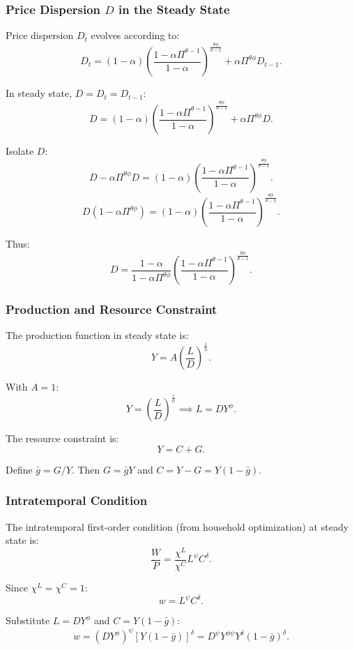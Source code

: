 \documentclass[12pt]{article}
\begin{document}
\subsubsection{Price Dispersion $D$ in the Steady State}

Price dispersion $D_t$ evolves according to:
\[
D_t = (1-\alpha)\left(\frac{1-\alpha \Pi^{\theta-1}}{1-\alpha}\right)^{\frac{\theta\phi}{\theta-1}} + \alpha \Pi^{\theta\phi}D_{t-1}.
\]

In steady state, $D=D_t=D_{t-1}$:
\[
D = (1-\alpha)\left(\frac{1-\alpha \Pi^{\theta-1}}{1-\alpha}\right)^{\frac{\theta\phi}{\theta-1}} + \alpha \Pi^{\theta\phi}D.
\]

Isolate $D$:
\[
D - \alpha\Pi^{\theta\phi}D = (1-\alpha)\left(\frac{1-\alpha \Pi^{\theta-1}}{1-\alpha}\right)^{\frac{\theta\phi}{\theta-1}}.
\]
\[
D(1-\alpha\Pi^{\theta\phi}) = (1-\alpha)\left(\frac{1-\alpha \Pi^{\theta-1}}{1-\alpha}\right)^{\frac{\theta\phi}{\theta-1}}.
\]

Thus:
\[
D = \frac{1-\alpha}{1-\alpha\Pi^{\theta\phi}}\left(\frac{1-\alpha\Pi^{\theta-1}}{1-\alpha}\right)^{\frac{\theta\phi}{\theta-1}}.
\]


\subsubsection{Production and Resource Constraint}

The production function in steady state is:
\[
Y = A\left(\frac{L}{D}\right)^{\frac{1}{\phi}}.
\]

With $A=1$:
\[
Y = \left(\frac{L}{D}\right)^{\frac{1}{\phi}} \implies L = D Y^\phi.
\]

The resource constraint is:
\[
Y = C + G.
\]

Define $\bar{g}=G/Y$. Then $G=\bar{g}Y$ and $C=Y-G=Y(1-\bar{g})$.


\subsubsection{Intratemporal Condition}

The intratemporal first-order condition (from household optimization) at steady state is:
\[
\frac{W}{P} = \frac{\chi^L}{\chi^C}L^\psi C^\delta.
\]

Since $\chi^L=\chi^C=1$:
\[
w = L^\psi C^\delta.
\]

Substitute $L=DY^\phi$ and $C=Y(1-\bar{g})$:
\[
w = (DY^\phi)^\psi [Y(1-\bar{g})]^\delta = D^\psi Y^{\phi \psi}Y^\delta (1-\bar{g})^\delta.
\]
\end{document}
